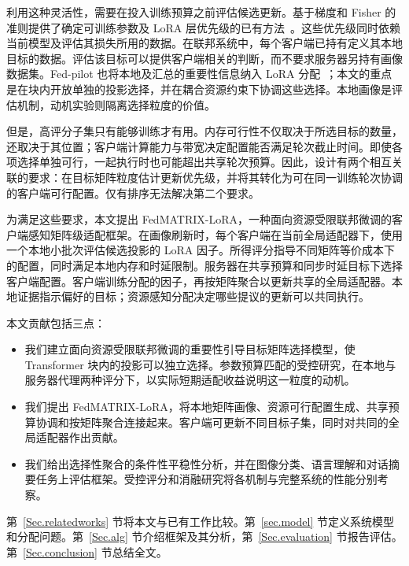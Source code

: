 利用这种灵活性，需要在投入训练预算之前评估候选更新。基于梯度和 Fisher 的准则提供了确定可训练参数及 LoRA 层优先级的已有方法~\cite{fm_fish2021,zhang2025fedhello}。这些优先级同时依赖当前模型及评估其损失所用的数据。在联邦系统中，每个客户端已持有定义其本地目标的数据。评估该目标可以提供客户端相关的判断，而不要求服务器另持有画像数据集。Fed-pilot 也将本地及汇总的重要性信息纳入 LoRA 分配~\cite{fm_fedpilot2025}；本文的重点是在块内开放单独的投影选择，并在耦合资源约束下协调这些选择。本地画像是评估机制，动机实验则隔离选择粒度的价值。

但是，高评分子集只有能够训练才有用。内存可行性不仅取决于所选目标的数量，还取决于其位置；客户端计算能力与带宽决定配置能否满足轮次截止时间。即使各项选择单独可行，一起执行时也可能超出共享轮次预算。因此，设计有两个相互关联的要求：在目标矩阵粒度估计更新优先级，并将其转化为可在同一训练轮次协调的客户端可行配置。仅有排序无法解决第二个要求。

为满足这些要求，本文提出 FedMATRIX-LoRA，一种面向资源受限联邦微调的客户端感知矩阵级适配框架。在画像刷新时，每个客户端在当前全局适配器下，使用一个本地小批次评估候选投影的 LoRA 因子。所得评分指导不同矩阵等价成本下的配置，同时满足本地内存和时延限制。服务器在共享预算和同步时延目标下选择客户端配置。客户端训练分配的因子，再按矩阵聚合以更新共享的全局适配器。本地证据指示偏好的目标；资源感知分配决定哪些提议的更新可以共同执行。

本文贡献包括三点：
\begin{itemize}
\item 我们建立面向资源受限联邦微调的重要性引导目标矩阵选择模型，使 Transformer 块内的投影可以独立选择。参数预算匹配的受控研究，在本地与服务器代理两种评分下，以实际短期适配收益说明这一粒度的动机。
\item 我们提出 FedMATRIX-LoRA，将本地矩阵画像、资源可行配置生成、共享预算协调和按矩阵聚合连接起来。客户端可更新不同目标子集，同时对共同的全局适配器作出贡献。
\item 我们给出选择性聚合的条件性平稳性分析，并在图像分类、语言理解和对话摘要任务上评估框架。受控评分和消融研究将各机制与完整系统的性能分别考察。
\end{itemize}

第~\ref{Sec.relatedworks} 节将本文与已有工作比较。第~\ref{sec.model} 节定义系统模型和分配问题。第~\ref{Sec.alg} 节介绍框架及其分析，第~\ref{Sec.evaluation} 节报告评估。第~\ref{Sec.conclusion} 节总结全文。
